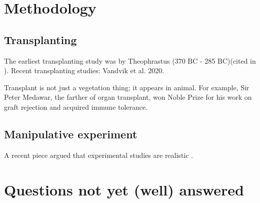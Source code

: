 \documentclass[letterpaper, 10pt]{article}
\begin{document}
\section{Methodology}
\subsection{Transplanting}
The earliest transplanting study was by Theophrastus (370 BC - 285 BC)(cited in \citet{woodward1987climate}). Recent transplanting studies: Vandvik et al. 2020\citep{vandvik2020biotic}.

Transplant is not just a vegetation thing; it appears in animal. For example, Sir Peter Medawar, the farther of organ transplant, won Noble Prize for his work on graft rejection and acquired immune tolerance.

\subsection{Manipulative experiment}
A recent piece argued that experimental studies are realistic \citep{jochum2020results}.

\section{Questions not yet (well) answered}



\end{document}
